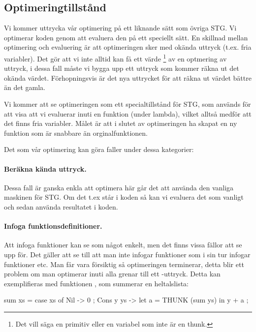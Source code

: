 \documentclass[Rapport]{subfiles}
\begin{document}
\subsection{Optimeringtillstånd}


Vi kommer uttrycka vår optimering på ett liknande sätt som övriga STG. Vi optimerar
koden genom att evaluera den på ett speciellt sätt. En skillnad mellan optimering och
evaluering är att optimeringen sker med okända uttryck (t.ex. fria variabler). 
Det gör att vi inte alltid kan få ett värde \footnote{ Det vill säga en primitiv eller en variabel som inte
är en thunk.}  av en optmering av uttryck, i dessa
fall måste vi bygga upp ett uttryck som kommer räkna ut det okända värdet. Förhopningsvis
är det nya uttrycket för att räkna ut värdet bättre än det gamla.

Vi kommer att se optimeringen som ett specialtillstånd för STG, som används
för att visa att vi evaluerar inuti en funktion (under lambda), vilket alltså medför
att det finns fria variabler. Målet  är att i slutet av optimeringen
ha skapat en ny funktion som är snabbare än orginalfunktionen.

Det som vår optimering kan göra faller under dessa kategorier:

\paragraph{ Beräkna kända uttryck. }
Dessa fall är ganska enkla att optimera här går det att använda den vanliga
maskinen för STG. Om det t.ex står  i koden så kan vi evaluera
det som vanligt och sedan använda resultatet  i koden.

\paragraph{ Infoga funktionsdefinitioner. }

Att infoga funktioner kan se som något enkelt, men det finns vissa fällor att se upp
för. Det gäller att se till att man inte infogar funktioner som i sin tur infogar funktioner etc.
Man får vara försiktig så optimeringen terminerar, detta blir ett problem om man
optimerar inuti alla grenar till ett -uttryck. Detta kan exemplifieras
med funktionen , som summerar en heltalslista:

\begin{codeEx}
sum xs = case xs of
    { Nil -> 0
    ; Cons y ys -> let
        { a = THUNK (sum ys)
        } in y + a
    };
\end{codeEx}
\end{document}
